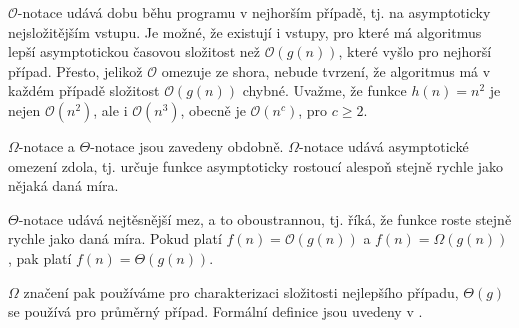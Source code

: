 \documentclass[12pt]{report}			%
\begin{document}
			$\mathcal{O}$-notace udává dobu běhu programu v nejhorším případě, tj. na asymptoticky nejsložitějším vstupu. Je možné, že existují i vstupy, pro které má algoritmus lepší asymptotickou časovou složitost než $\mathcal{O}(g(n))$, které vyšlo pro nejhorší případ. Přesto, jelikož $\mathcal{O}$ omezuje ze shora, nebude tvrzení, že algoritmus má v každém případě složitost $\mathcal{O}(g(n))$ chybné. Uvažme, že funkce $h(n)=n^2$ je nejen $\mathcal{O}(n^2)$, ale i $\mathcal{O}(n^3)$, obecně je $\mathcal{O}(n^c)$, pro $c \geq 2$.
			
			$\Omega$-notace a $\Theta$-notace jsou zavedeny obdobně. $\Omega$-notace udává asymptotické omezení zdola, tj. určuje funkce asymptoticky rostoucí alespoň stejně rychle jako nějaká daná míra.
			
			$\Theta$-notace udává nejtěsnější mez, a to oboustrannou, tj. říká, že funkce roste stejně rychle jako daná míra. Pokud platí 
$f(n) = \mathcal{O}(g(n))$ a $f(n) = \Omega(g(n))$, pak platí $f(n) = \Theta(g(n))$.

			$\Omega$ značení pak používáme pro charakterizaci složitosti nejlepšího případu, $\Theta(g)$ se používá pro průměrný případ.
			Formální definice jsou uvedeny v \cite{intro}.
			

			
			
\end{document}
